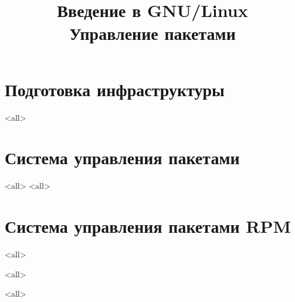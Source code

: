 

\title{Введение в GNU/Linux\\Управление пакетами}








\begin{frame}
	\frametitle{}
	\titlepage
	\vspace{-0.5cm}
	\begin{center}
	\end{center}
\end{frame}




\section{Подготовка инфраструктуры}
\mode<all>{}

\section{Система управления пакетами}

\mode<all>{}
\mode<all>{}

\section{Система управления пакетами RPM}
\mode<all>{}

\mode<all>{}

\mode<all>
